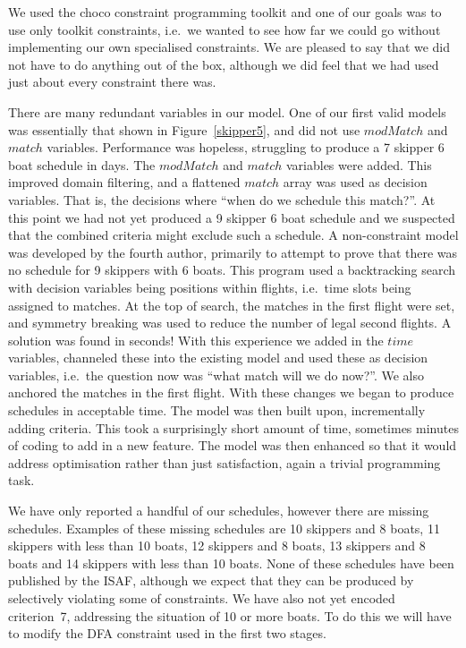 \documentclass{llncs}
\newcommand{\match}{\mathit{match}}
\newcommand{\modMatch}{\mathit{modMatch}}
\newcommand{\timeVar}{\mathit{time}}
\begin{document}
We used the choco constraint programming toolkit and one of our goals was to use only toolkit
constraints, i.e.\ we wanted to see how far we could go without implementing our own specialised
constraints. We are pleased to say that we did not have to do anything out of the box, although we
did feel that we had used just about every constraint there was.

There are many redundant variables in our model. One of our first valid models was essentially that
shown in Figure~\ref{skipper5}, and did not use $\modMatch$ and $\match$ variables. Performance was
hopeless, struggling to produce a 7 skipper 6 boat schedule in days. The $\modMatch$ and $\match$
variables were added. This improved domain filtering, and a flattened $\match$ array was used as
decision variables. That is, the decisions where ``when do we schedule this match?''.  At this point
we had not yet produced a 9 skipper 6 boat schedule and we suspected that the combined criteria
might exclude such a schedule. A non-constraint model was developed by the fourth author, primarily
to attempt to prove that there was no schedule for 9 skippers with 6 boats. This program used a
backtracking search with decision variables being positions within flights, i.e.\ time slots being
assigned to matches. At the top of search, the matches in the first flight were set, and symmetry
breaking was used to reduce the number of legal second flights. A solution was found in seconds!
With this experience we added in the $\timeVar$ variables, channeled these into the existing model
and used these as decision variables, i.e.\ the question now was ``what match will we do now?''. We
also anchored the matches in the first flight. With these changes we began to produce schedules in
acceptable time. The model was then built upon, incrementally adding criteria. This took a
surprisingly short amount of time, sometimes minutes of coding to add in a new feature. The model
was then enhanced so that it would address optimisation rather than just satisfaction, again a
trivial programming task.

We have only reported a handful of our schedules, however there are missing schedules. Examples of
these missing schedules are 10 skippers and 8 boats, 11 skippers with less than 10 boats, 12
skippers and 8 boats, 13 skippers and 8 boats and 14 skippers with less than 10 boats. None of these
schedules have been published by the ISAF, although we expect that they can be produced by
selectively violating some of constraints. We have also not yet encoded criterion~7, addressing the
situation of 10 or more boats. To do this we will have to modify the DFA constraint used in the
first two stages.
\end{document}
